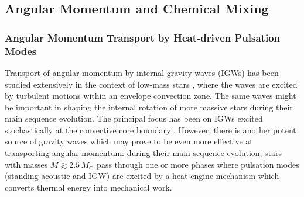 
\subsection{Angular Momentum and Chemical Mixing}

\subsubsection{Angular Momentum Transport by Heat-driven Pulsation Modes}

Transport of angular momentum by internal gravity waves (IGWs) has been studied extensively in the context of low-mass stars \citep[e.g.,][]{Schatzman:1993,Kumar:1997,Zahn:1997,Talon:2002,Talon:2005,Rogers:2008aa}, where the waves are excited by turbulent motions within an envelope convection zone. The same waves might be important in shaping the internal rotation of more massive stars during their main sequence evolution. The principal focus has been on IGWs excited stochastically at the convective core boundary \citep[e.g.][]{Rogers:2013,Lee:2014,Rogers:2015}. However, there is another potent source of gravity waves which may prove to be even more effective at transporting angular momentum: during their main sequence evolution, stars with masses $M \gtrsim 2.5\,M_{\odot}$ pass through one or more phases where pulsation modes (standing acoustic and IGW) are excited by a heat engine mechanism which converts thermal energy into mechanical work.

